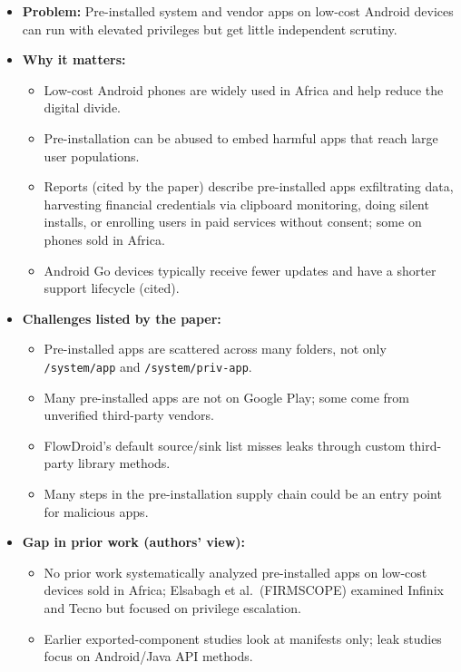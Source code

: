 \documentclass[11pt,a4paper]{article}
\begin{document}
\begin{enumerate}
    \begin{itemize}[leftmargin=*,itemsep=1pt,topsep=2pt]
        \item \textbf{Problem:} Pre-installed system and vendor apps on low-cost Android devices can run with elevated privileges but get little independent scrutiny.
        \item \textbf{Why it matters:}
        \begin{itemize}[itemsep=0pt]
            \item Low-cost Android phones are widely used in Africa and help reduce the digital divide.
            \item Pre-installation can be abused to embed harmful apps that reach large user populations.
            \item Reports (cited by the paper) describe pre-installed apps exfiltrating data, harvesting financial credentials via clipboard monitoring, doing silent installs, or enrolling users in paid services without consent; some on phones sold in Africa.
            \item Android Go devices typically receive fewer updates and have a shorter support lifecycle (cited).
        \end{itemize}
        \item \textbf{Challenges listed by the paper:}
        \begin{itemize}[itemsep=0pt]
            \item Pre-installed apps are scattered across many folders, not only \texttt{/system/app} and \texttt{/system/priv-app}.
            \item Many pre-installed apps are not on Google Play; some come from unverified third-party vendors.
            \item FlowDroid's default source/sink list misses leaks through custom third-party library methods.
            \item Many steps in the pre-installation supply chain could be an entry point for malicious apps.
        \end{itemize}
        \item \textbf{Gap in prior work (authors' view):}
        \begin{itemize}[itemsep=0pt]
            \item No prior work systematically analyzed pre-installed apps on low-cost devices sold in Africa; Elsabagh et al.\ (FIRMSCOPE) examined Infinix and Tecno but focused on privilege escalation.
            \item Earlier exported-component studies look at manifests only; leak studies focus on Android/Java API methods.

\end{itemize}
\end{itemize}
\end{enumerate}
\end{document}
